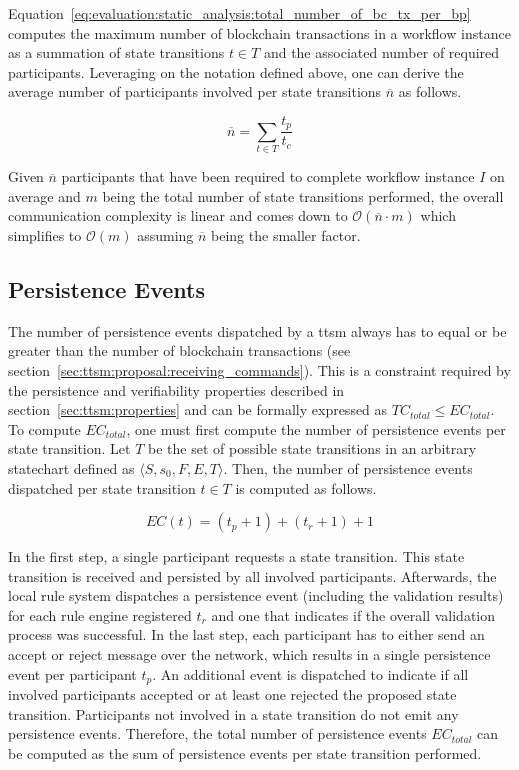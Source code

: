 Equation~\ref{eq:evaluation:static_analysis:total_number_of_bc_tx_per_bp} computes the maximum number of blockchain transactions in a workflow instance as a summation of state transitions $t \in T$ and the associated number of required participants. Leveraging on the notation defined above, one can derive the average number of participants involved per state transitions $\overline{n}$ as follows.

\begin{equation}
\label{eq:evaluation:static_analysis:average_number_of_participants}
\overline{n} = \sum_{t \in T} \frac{t_p}{t_c}
\end{equation}

Given $\overline{n}$ participants that have been required to complete workflow instance $I$ on average and $m$ being the total number of state transitions performed, the overall communication complexity is linear and comes down to $\mathcal{O}(\overline{n} \cdot m)$ which simplifies to $\mathcal{O}(m)$ assuming $\overline{n}$ being the smaller factor.


\subsection{Persistence Events}
\label{sec:evaluation:static_analysis:persistence_events}
The number of persistence events dispatched by a \gls{ttsm} always has to equal or be greater than the number of blockchain transactions (see section~\ref{sec:ttsm:proposal:receiving_commands}). This is a constraint required by the persistence and verifiability properties described in section~\ref{sec:ttsm:properties} and can be formally expressed as $TC_{total} \leq EC_{total}$. To compute $EC_{total}$, one must first compute the number of persistence events per state transition. Let $T$ be the set of possible state transitions in an arbitrary statechart defined as $\langle S, s_0, F, E, T \rangle$. Then, the number of persistence events dispatched per state transition $t \in T$ is computed as follows.

\begin{equation}
\label{eq:ttsm:proposal:number_of_events_per_transition}
EC(t) = (t_p + 1) + (t_r + 1) + 1
\end{equation}

In the first step, a single participant requests a state transition. This state transition is received and persisted by all involved participants. Afterwards, the local rule system dispatches a persistence event (including the validation results) for each rule engine registered $t_r$ and one that indicates if the overall validation process was successful. In the last step, each participant has to either send an accept or reject message over the network, which results in a single persistence event per participant $t_p$. An additional event is dispatched to indicate if all involved participants accepted or at least one rejected the proposed state transition. Participants not involved in a state transition do not emit any persistence events. Therefore, the total number of persistence events $EC_{total}$ can be computed as the sum of persistence events per state transition performed.

